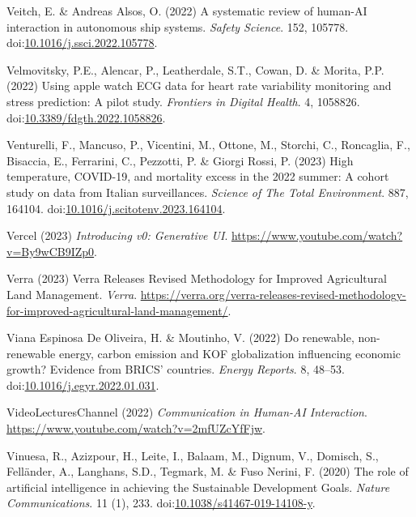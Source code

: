 \documentclass[
  letterpaper,
  DIV=11,
  numbers=noendperiod]{scrartcl}
\newlength{\cslhangindent}
\newenvironment{CSLReferences}[2] %
 {\begin{list}{}{%
  \setlength{\itemindent}{0pt}
  \setlength{\leftmargin}{0pt}
  \setlength{\parsep}{0pt}
  \ifodd #1
   \setlength{\leftmargin}{\cslhangindent}
   \setlength{\itemindent}{-1\cslhangindent}
  \fi
  \setlength{\itemsep}{#2\baselineskip}}}
 {\end{list}}
\begin{document}
\begin{CSLReferences}{0}{1}
Veitch, E. \& Andreas Alsos, O. (2022) A systematic review of human-{AI}
interaction in autonomous ship systems. \emph{Safety Science}. 152,
105778.
doi:\href{https://doi.org/10.1016/j.ssci.2022.105778}{10.1016/j.ssci.2022.105778}.

Velmovitsky, P.E., Alencar, P., Leatherdale, S.T., Cowan, D. \& Morita,
P.P. (2022) Using apple watch {ECG} data for heart rate variability
monitoring and stress prediction: {A} pilot study. \emph{Frontiers in
Digital Health}. 4, 1058826.
doi:\href{https://doi.org/10.3389/fdgth.2022.1058826}{10.3389/fdgth.2022.1058826}.

Venturelli, F., Mancuso, P., Vicentini, M., Ottone, M., Storchi, C.,
Roncaglia, F., Bisaccia, E., Ferrarini, C., Pezzotti, P. \& Giorgi
Rossi, P. (2023) High temperature, {COVID-19}, and mortality excess in
the 2022 summer: A cohort study on data from {Italian} surveillances.
\emph{Science of The Total Environment}. 887, 164104.
doi:\href{https://doi.org/10.1016/j.scitotenv.2023.164104}{10.1016/j.scitotenv.2023.164104}.

Vercel (2023) \emph{Introducing v0: {Generative UI}}.
\url{https://www.youtube.com/watch?v=By9wCB9IZp0}.

Verra (2023) Verra {Releases Revised Methodology} for {Improved
Agricultural Land Management}. \emph{Verra}.
\url{https://verra.org/verra-releases-revised-methodology-for-improved-agricultural-land-management/}.

Viana Espinosa De Oliveira, H. \& Moutinho, V. (2022) Do renewable,
non-renewable energy, carbon emission and {KOF} globalization
influencing economic growth? {Evidence} from {BRICS}' countries.
\emph{Energy Reports}. 8, 48--53.
doi:\href{https://doi.org/10.1016/j.egyr.2022.01.031}{10.1016/j.egyr.2022.01.031}.

VideoLecturesChannel (2022) \emph{Communication in {Human-AI
Interaction}}. \url{https://www.youtube.com/watch?v=2mfUZcYfFjw}.

Vinuesa, R., Azizpour, H., Leite, I., Balaam, M., Dignum, V., Domisch,
S., Felländer, A., Langhans, S.D., Tegmark, M. \& Fuso Nerini, F. (2020)
The role of artificial intelligence in achieving the {Sustainable
Development Goals}. \emph{Nature Communications}. 11 (1), 233.
doi:\href{https://doi.org/10.1038/s41467-019-14108-y}{10.1038/s41467-019-14108-y}.


\end{CSLReferences}
\end{document}
